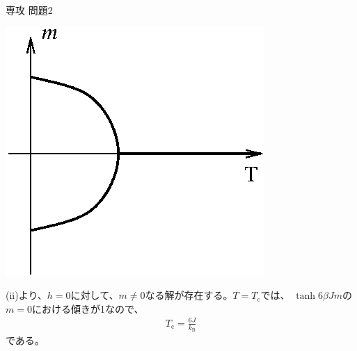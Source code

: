 \documentclass[fleqn]{jbook}
\begin{document}
\begin{answer}{専攻 問題2}{}
\begin{subanswers}
\begin{subsubanswers}
{   \begin{center}
    \includegraphics[clip]{1998phy2-2.eps}
   \end{center}
    } 
  \SubSubAnswer
    (ii)より、$h=0$に対して、$m \neq 0$なる解が存在する。$T=T_{\mathrm{c}}$では、
    $\tanh 6 \beta Jm$の$m=0$における傾きが1なので、
\begin{eqnarray}
      T_{\mathrm{c}} = \frac{6J}{k_{\mathrm{B}}} \nonumber
\end{eqnarray}
    である。    
  \end{subsubanswers}
\end{subanswers}



\end{answer}
\end{document}
